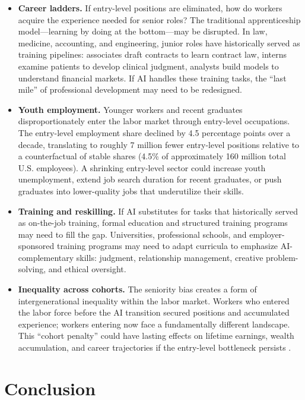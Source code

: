 \documentclass[12pt]{article}
\begin{document}
\begin{itemize}
\item \textbf{Career ladders.} If entry-level positions are eliminated, how do workers acquire the experience needed for senior roles? The traditional apprenticeship model---learning by doing at the bottom---may be disrupted. In law, medicine, accounting, and engineering, junior roles have historically served as training pipelines: associates draft contracts to learn contract law, interns examine patients to develop clinical judgment, analysts build models to understand financial markets. If AI handles these training tasks, the ``last mile'' of professional development may need to be redesigned.
\item \textbf{Youth employment.} Younger workers and recent graduates disproportionately enter the labor market through entry-level occupations. The entry-level employment share declined by 4.5 percentage points over a decade, translating to roughly 7 million fewer entry-level positions relative to a counterfactual of stable shares (4.5\% of approximately 160 million total U.S. employees). A shrinking entry-level sector could increase youth unemployment, extend job search duration for recent graduates, or push graduates into lower-quality jobs that underutilize their skills.
\item \textbf{Training and reskilling.} If AI substitutes for tasks that historically served as on-the-job training, formal education and structured training programs may need to fill the gap. Universities, professional schools, and employer-sponsored training programs may need to adapt curricula to emphasize AI-complementary skills: judgment, relationship management, creative problem-solving, and ethical oversight.
\item \textbf{Inequality across cohorts.} The seniority bias creates a form of intergenerational inequality within the labor market. Workers who entered the labor force before the AI transition secured positions and accumulated experience; workers entering now face a fundamentally different landscape. This ``cohort penalty'' could have lasting effects on lifetime earnings, wealth accumulation, and career trajectories if the entry-level bottleneck persists \citep{hershbein2018}.
\end{itemize}


\section{Conclusion}
\end{document}
